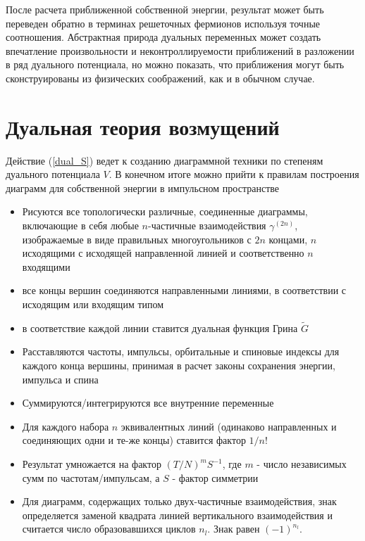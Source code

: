 \documentclass[11pt,a4paper]{report}
\begin{document}
После расчета приближенной собственной энергии, результат может быть переведен обратно в терминах решеточных фермионов используя точные соотношения. 
Абстрактная природа дуальных переменных может создать впечатление произвольности и неконтроллируемости приближений в разложении в ряд дуального потенциала, 
 но можно показать, что приближения могут быть сконструированы из физических соображений, как и в обычном случае.

\section{Дуальная теория возмущений}

Действие (\ref{dual_S}) ведет к созданию диаграммной техники по степеням дуального потенциала $V$. В конечном итоге можно прийти к правилам построения диаграмм для собственной энергии в импульсном пространстве
 
\begin{itemize}
 \label{rules}
 \item Рисуются все топологически различные, соединенные диаграммы, включающие в себя любые $n$-частичные взаимодействия $\gamma^{(2n)}$, изображаемые в виде правильных многоугольников с $2n$ концами, 
 $n$ исходящими с исходящей направленной линией и соответственно $n$ входящими
 \item все концы вершин соединяются направленными линиями, в соответствии с исходящим или входящим типом
 \item в соответствие каждой линии ставится дуальная функция Грина $\tilde{G}$
 \item Расставляются частоты, импульсы, орбитальные и спиновые индексы для каждого конца вершины, принимая в расчет законы сохранения энергии, импульса и спина
 \item Суммируются/интегрируются все внутренние переменные
 \item Для каждого набора $n$ эквивалентных линий (одинаково направленных и соединяющих одни и те-же концы) ставится фактор $1/n!$
 \item Результат умножается на фактор $(T/N)^m S^{-1}$, где $m$ - число независимых сумм по частотам/импульсам, а $S$ - фактор симметрии\cite{negele1998quantum}
 \item Для диаграмм, содержащих только двух-частичные взаимодействия, знак определяется заменой квадрата линией вертикального взаимодействия и считается число образовавшихся циклов $n_l$. Знак равен $(-1)^{n_l}$.
\end{itemize}
 
\end{document}
